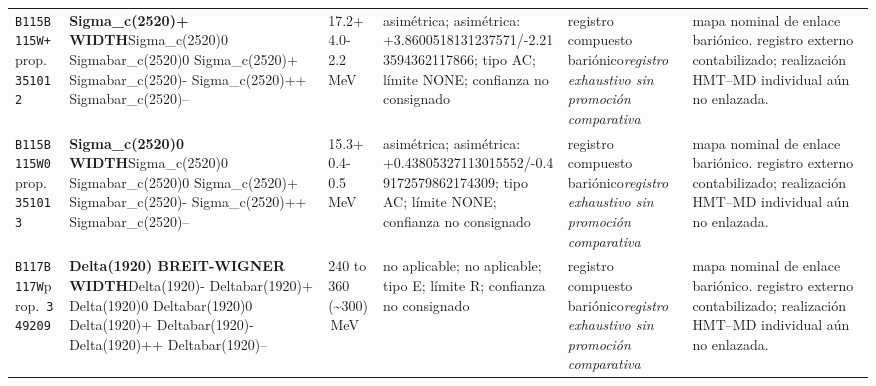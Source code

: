\begin{landscape}
\begin{longtable}{L{1.85cm}L{4.45cm}L{2.35cm}L{4.05cm}L{3.35cm}L{7.15cm}}
\texttt{B115}\newline \texttt{B115W+}\newline prop.\ \texttt{351012} & \textbf{Sigma\_\allowbreak{}c(2520)+ WIDTH}\newline Sigma\_\allowbreak{}c(2520)0 \textbar{}\allowbreak{} Sigmabar\_\allowbreak{}c(2520)0 \textbar{}\allowbreak{} Sigma\_\allowbreak{}c(2520)+ \textbar{}\allowbreak{} Sigmabar\_\allowbreak{}c(2520)- \textbar{}\allowbreak{} Sigma\_\allowbreak{}c(2520)++ \textbar{}\allowbreak{} Sigmabar\_\allowbreak{}c(2520)-- & 17.2+4.0-2.2\,MeV & asimétrica; asimétrica: +3.8600518131237571/-2.213594362117866; tipo AC; límite NONE; confianza no consignado & registro compuesto bariónico\newline \emph{registro exhaustivo sin promoción comparativa} & mapa nominal de enlace bariónico. registro externo contabilizado; realización HMT--MD individual aún no enlazada. \\
\texttt{B115}\newline \texttt{B115W0}\newline prop.\ \texttt{351013} & \textbf{Sigma\_\allowbreak{}c(2520)0 WIDTH}\newline Sigma\_\allowbreak{}c(2520)0 \textbar{}\allowbreak{} Sigmabar\_\allowbreak{}c(2520)0 \textbar{}\allowbreak{} Sigma\_\allowbreak{}c(2520)+ \textbar{}\allowbreak{} Sigmabar\_\allowbreak{}c(2520)- \textbar{}\allowbreak{} Sigma\_\allowbreak{}c(2520)++ \textbar{}\allowbreak{} Sigmabar\_\allowbreak{}c(2520)-- & 15.3+0.4-0.5\,MeV & asimétrica; asimétrica: +0.43805327113015552/-0.49172579862174309; tipo AC; límite NONE; confianza no consignado & registro compuesto bariónico\newline \emph{registro exhaustivo sin promoción comparativa} & mapa nominal de enlace bariónico. registro externo contabilizado; realización HMT--MD individual aún no enlazada. \\
\texttt{B117}\newline \texttt{B117W}\newline prop.\ \texttt{349209} & \textbf{Delta(1920) BREIT-WIGNER WIDTH}\newline Delta(1920)- \textbar{}\allowbreak{} Deltabar(1920)+ \textbar{}\allowbreak{} Delta(1920)0 \textbar{}\allowbreak{} Deltabar(1920)0 \textbar{}\allowbreak{} Delta(1920)+ \textbar{}\allowbreak{} Deltabar(1920)- \textbar{}\allowbreak{} Delta(1920)++ \textbar{}\allowbreak{} Deltabar(1920)-- & 240 to 360 (\textasciitilde{}300)\,MeV & no aplicable; no aplicable; tipo E; límite R; confianza no consignado & registro compuesto bariónico\newline \emph{registro exhaustivo sin promoción comparativa} & mapa nominal de enlace bariónico. registro externo contabilizado; realización HMT--MD individual aún no enlazada. \\

\end{longtable}
\end{landscape}
